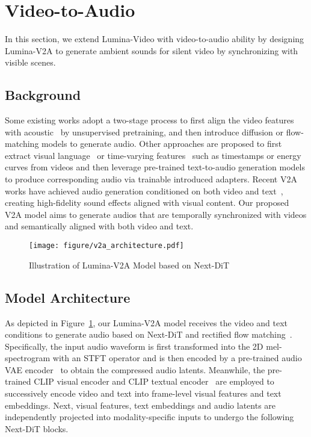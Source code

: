 \section{Video-to-Audio}
\label{sec:V2A}
In this section, we extend Lumina-Video with video-to-audio ability by designing Lumina-V2A to generate ambient sounds for silent video by synchronizing with visible scenes.
\subsection{Background}
Some existing works adopt a two-stage process to first align the video features with acoustic~\cite{luo2024diff, wangfrieren} by unsupervised pretraining, and then introduce diffusion or flow-matching models to generate audio. Other approaches are proposed to first extract visual language~\cite{wang2024v2a} or time-varying features~\cite{zhang2024foleycrafter, jeong2024read, lee2024video, xie2024sonicvisionlm} such as timestamps or energy curves from videos and then leverage pre-trained text-to-audio generation models to produce corresponding audio via trainable introduced adapters. Recent V2A works have achieved audio generation conditioned on both video and text~\cite{polyak2024movie, cheng2024taming, chen2024video}, creating high-fidelity sound effects aligned with visual content. Our proposed V2A model aims to generate audios that are temporally synchronized with videos and semantically aligned with both video and text.          

\begin{figure}[t]
    \centering
    \texttt{[image: figure/v2a\_architecture.pdf]}
    \vspace{-2em}
    \caption{Illustration of Lumina-V2A Model based on Next-DiT}
    \label{fig:v2a_architecture}
    \vspace{-1em}
\end{figure}

\subsection{Model Architecture}
As depicted in Figure~\ref{fig:v2a_architecture}, our Lumina-V2A model receives the video and text conditions to generate audio based on Next-DiT and rectified flow matching~\cite{RectifiedFlow}. Specifically, the input audio waveform is first transformed into the 2D mel-spectrogram with an STFT operator and is then encoded by a pre-trained audio VAE encoder~\cite{liu2023audioldm} to obtain the compressed audio latents. Meanwhile, the pre-trained CLIP visual encoder and CLIP textual encoder~\cite{fang2023data, radford2021learning} are employed to successively encode video and text into frame-level visual features and text embeddings. Next, visual features, text embeddings and audio latents are independently projected into modality-specific inputs to undergo the following Next-DiT blocks. 

